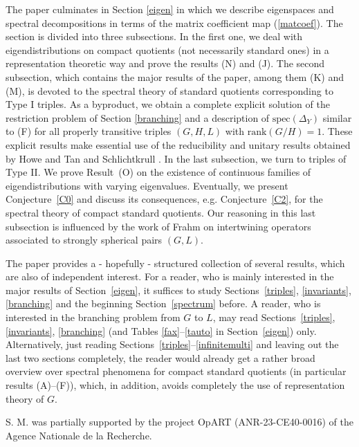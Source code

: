 \documentclass[10]{amsart}
\theoremstyle{remark}
\theoremstyle{definition}
\numberwithin{equation}{section}
\newcommand{\rank}{\text{rank}}
\newcommand{\spec}{{\mathrm{spec}}}
\begin{document}
{The paper culminates in Section \ref{eigen} in which we describe eigenspaces and spectral decompositions in terms of the matrix coefficient map (\ref{matcoef}). The section is divided into three subsections. In the first one, we deal with eigendistributions on compact quotients (not necessarily standard ones) in a representation theoretic way and prove the results (N) and (J).
The second subsection, which contains the major results of the paper, among them (K) and (M),  is devoted to the spectral theory of standard quotients corresponding to Type I triples. As a byproduct, we obtain a complete explicit solution of the restriction problem of Section \ref{branching} and a description of $\spec(\Delta_Y)$ similar to (F) for all properly transitive triples
$(G,H,L)$ with $\rank(G/H)=1$. These explicit results make essential use of the reducibility and unitary results obtained by Howe and Tan \cite{HoTa93} and Schlichtkrull \cite{Sch87}. In the last subsection, we turn to triples of Type II. We prove Result~(O) on the existence of continuous families of eigendistributions with varying eigenvalues. Eventually, we present Conjecture~\ref{C0} and discuss its consequences, e.g. Conjecture~\ref{C2}, for the spectral theory of compact standard quotients. Our reasoning in this last subsection is influenced by the work of Frahm \cite{Mol17} on intertwining operators associated to strongly spherical pairs $(G,L)$.

The paper provides a - hopefully - structured collection of several results,
which are also of independent interest. For a reader, who is mainly interested in the major results of Section~\ref{eigen}, it suffices to study Sections~\ref{triples},
\ref{invariants}, \ref{branching} and the beginning Section~\ref{spectrum} before. A reader, who is interested in the branching problem from $G$ to $L$, may read Sections~\ref{triples},
\ref{invariants}, \ref{branching} (and Tables \ref{fax}--\ref{tauto} in Section~\ref{eigen}) only. Alternatively, just reading Sections~\ref{triples}--\ref{infinitemulti} and leaving out the last two sections completely, the reader would  already
get a rather broad overview over spectral phenomena for compact standard quotients (in particular results (A)--(F)), which, in addition, avoids completely the use of representation theory of $G$.

\bigskip

 {S. M. was partially supported by the project OpART (ANR-23-CE40-0016) of the Agence Nationale de la Recherche.}

}
\end{document}
